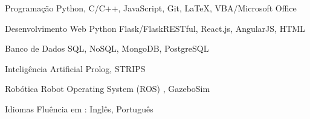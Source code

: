 


\begin{cvskills}


\cvskill
{Programação} %
{Python, C/C++, JavaScript, Git, LaTeX, VBA/Microsoft Office} %


\cvskill
{Desenvolvimento Web} %
{Python Flask/FlaskRESTful, React.js, AngularJS, HTML} %



\cvskill
{Banco de Dados} %
{SQL, NoSQL, MongoDB, PostgreSQL} %



\cvskill
{Inteligência Artificial} %
{Prolog, STRIPS} %


\cvskill
{Robótica} %
{Robot Operating System (ROS) , GazeboSim} %

\cvskill
{}
{}

\cvskill
{Idiomas} %
{Fluência em : Inglês, Português} %


\end{cvskills}
